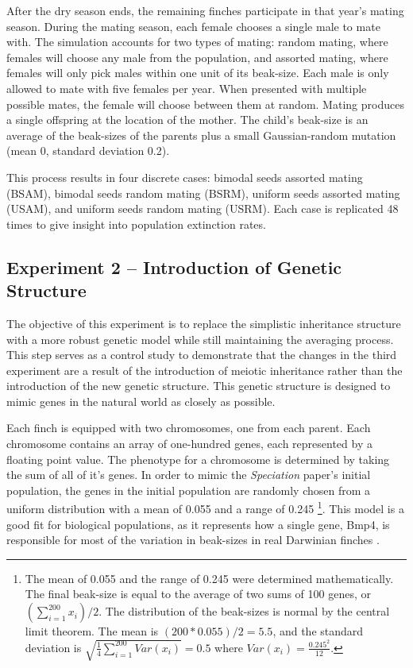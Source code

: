 \documentclass{article}
\begin{document}
After the dry season ends, the remaining finches participate in that year's mating season. During the mating season, each female chooses a single male to mate with. The simulation accounts for two types of mating: random mating, where females will choose any male from the population, and assorted mating, where females will only pick males within one unit of its beak-size. Each male is only allowed to mate with five females per year. When presented with multiple possible mates, the female will choose between them at random. Mating produces a single offspring at the location of the mother. The child’s beak-size is an average of the beak-sizes of the parents plus a small Gaussian-random mutation (mean 0, standard deviation 0.2).

This process results in four discrete cases: bimodal seeds assorted mating (BSAM), bimodal seeds random mating (BSRM), uniform seeds assorted mating (USAM), and uniform seeds random mating (USRM). Each case is replicated 48 times to give insight into population extinction rates. 



\subsection{Experiment 2 -- Introduction of Genetic Structure}

The objective of this experiment is to replace the simplistic inheritance structure with a more robust genetic model while still maintaining the averaging process. This step serves as a control study to demonstrate that the changes in the third experiment are a result of the introduction of meiotic inheritance rather than the introduction of the new genetic structure. This genetic structure is designed to mimic genes in the natural world as closely as possible.

Each finch is equipped with two chromosomes, one from each parent. Each chromosome contains an array of one-hundred genes, each represented by a floating point value. The phenotype for a chromosome is determined by taking the sum of all of it's genes. In order to mimic the \textit{Speciation} paper’s initial population, the genes in the initial population are randomly chosen from a uniform distribution with a mean of 0.055 and a range of 0.245 \footnote{The mean of 0.055 and the range of 0.245 were determined mathematically. The final beak-size is equal to the average of two sums of 100 genes, or $(\sum_{i=1}^{200} x_{i})/2$. The distribution of the beak-sizes is normal by the central limit theorem. The mean is $(200 * 0.055)/2 = 5.5$, and the standard deviation is $\sqrt{\frac{1}{4}\sum_{i=1}^{200}Var(x_{i})} = 0.5$ where $Var(x_{i}) = \frac{0.245^2}{12}$.}. This model is a good fit for biological populations, as it represents how a single gene, Bmp4, is responsible for most of the variation in beak-sizes in real Darwinian finches \cite{BMP4}. 
\end{document}
